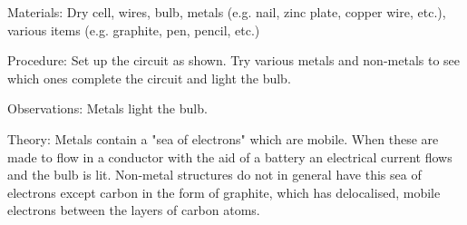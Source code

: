 \begin{multicols}{2}
\begin{description*}
\item[Materials:]{Dry cell, wires, bulb, metals (e.g. nail, zinc plate, copper wire, etc.), various items (e.g. graphite, pen, pencil, etc.)}
\item[Procedure:]{Set up the circuit as shown. Try various metals and non-metals to see which ones complete the circuit and light the bulb.}
\item[Observations:]{Metals light the bulb.}
\item[Theory:]{Metals contain a "sea of electrons" which are
mobile. When these are made to flow in a
conductor with the aid of a battery an electrical
current flows and the bulb is lit. Non-metal
structures do not in general have this sea of
electrons except carbon in the form of graphite,
which has delocalised, mobile electrons between
the layers of carbon atoms.}
\end{description*}



\end{multicols}
